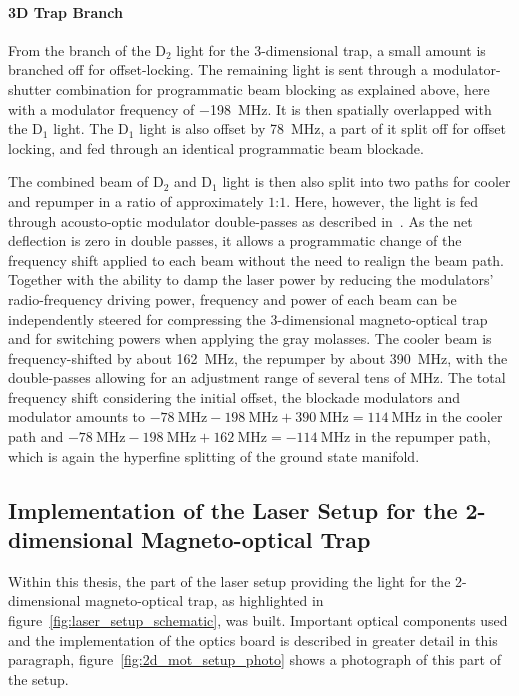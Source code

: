 \paragraph{3D Trap Branch} From the branch of the D$_2$ light for the 3-dimensional trap, a small amount is branched off for offset-locking. The remaining light is sent through a modulator-shutter combination for programmatic beam blocking as explained above, here with a modulator frequency of \SI{-198}{\mega\hertz}. It is then spatially overlapped with the D$_1$ light. The D$_1$ light is also offset by \SI{+78}{\mega\hertz}, a part of it split off for offset locking, and fed through an identical programmatic beam blockade.

The combined beam of D$_2$ and D$_1$ light is then also split into two paths for cooler and repumper in a ratio of approximately $1$:$1$. Here, however, the light is fed through acousto-optic modulator double-passes as described in~\cite{qesja_design_2022}. As the net deflection is zero in double passes, it allows a programmatic change of the frequency shift applied to each beam without the need to realign the beam path. Together with the ability to damp the laser power by reducing the modulators' radio-frequency driving power, frequency and power of each beam can be independently steered for compressing the 3-dimensional magneto-optical trap and for switching powers when applying the gray molasses. The cooler beam is frequency-shifted by about \SI{+162}{\mega\hertz}, the repumper by about \SI{+390}{\mega\hertz}, with the double-passes allowing for an adjustment range of several tens of \si{\mega\hertz}. The total frequency shift considering the initial offset, the blockade modulators and modulator amounts to $\SI{-78}{\mega\hertz} - \SI{198}{\mega\hertz} + \SI{390}{\mega\hertz} = \SI{+114}{\mega\hertz}$ in the cooler path and $\SI{-78}{\mega\hertz} - \SI{198}{\mega\hertz} + \SI{162}{\mega\hertz} = \SI{-114}{\mega\hertz}$ in the repumper path, which is again the hyperfine splitting of the ground state manifold.


\subsection*{Implementation of the Laser Setup for the 2-dimensional Magneto-optical Trap}
Within this thesis, the part of the laser setup providing the light for the 2-dimensional magneto-optical trap, as highlighted in figure~\ref{fig:laser_setup_schematic}, was built.
Important optical components used and the implementation of the optics board is described in greater detail in this paragraph, figure~\ref{fig:2d_mot_setup_photo} shows a photograph of this part of the setup.

